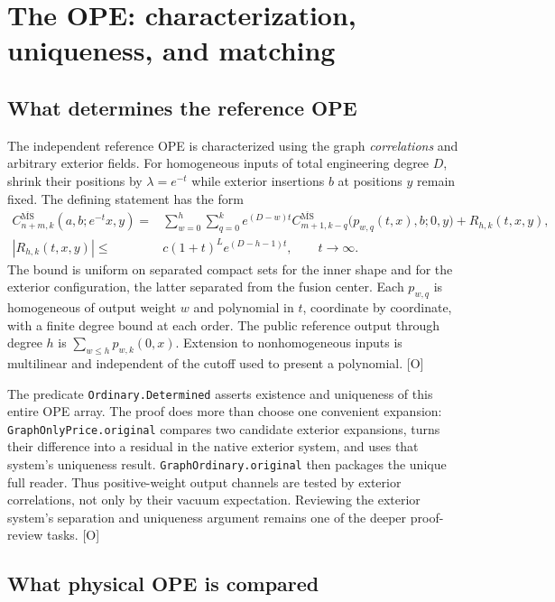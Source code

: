 \documentclass[11pt]{article}
\newcommand{\MS}{\overline{\mathrm{MS}}}
\newcommand{\code}[1]{{\small\nolinkurl{#1}}}
\newcommand{\src}[1]{\textsf{[#1]}}
\begin{document}
\section{The OPE: characterization, uniqueness, and matching}
\label{sec:ope}

\subsection{What determines the reference OPE}

The independent reference OPE is characterized using the graph
\emph{correlations} and arbitrary exterior fields. For homogeneous
inputs of total engineering degree $D$, shrink their positions by
$\lambda=e^{-t}$ while exterior insertions $b$ at positions $y$ remain
fixed. The defining statement has the form
\begin{align}\label{eq:exterior}
 C^{\MS}_{n+m,k}(a,b;e^{-t}x,y)
 ={}&\sum_{w=0}^{h}\sum_{q=0}^{k}
 e^{(D-w)t}
 C^{\MS}_{m+1,k-q}\bigl(p_{w,q}(t,x),b;0,y\bigr)
 +R_{h,k}(t,x,y),\\[-2pt]
 |R_{h,k}(t,x,y)|\le{}&c(1+t)^L e^{(D-h-1)t},
 \qquad t\longrightarrow\infty.\nonumber
\end{align}
The bound is uniform on separated compact sets for the inner shape and
for the exterior configuration, the latter separated from the fusion
center. Each $p_{w,q}$ is homogeneous of output weight $w$ and
polynomial in $t$, coordinate by coordinate, with a finite degree bound
at each order. The public reference output through degree $h$ is
$\sum_{w\le h}p_{w,k}(0,x)$. Extension to nonhomogeneous inputs is
multilinear and independent of the cutoff used to present a polynomial.
\src{O}

The predicate \code{Ordinary.Determined} asserts existence and
uniqueness of this entire OPE array. The proof does more than choose
one convenient expansion: \code{GraphOnlyPrice.original} compares two
candidate exterior expansions, turns their difference into a residual
in the native exterior system, and uses that system's uniqueness
result. \code{GraphOrdinary.original} then packages the unique full
reader. Thus positive-weight output channels are tested by exterior
correlations, not only by their vacuum expectation. Reviewing the
exterior system's separation and uniqueness argument remains one of
the deeper proof-review tasks. \src{O}

\subsection{What physical OPE is compared}
\end{document}
